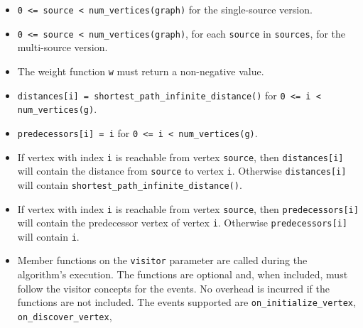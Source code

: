 \begin{itemdescr}
      \pnum\mandates
            \begin{itemize}
                  \item
                        \lstinline{0 <= source < num_vertices(graph)} for the single-source version.
                  \item
                        \lstinline{0 <= source < num_vertices(graph)}, for each \lstinline{source} in \lstinline{sources}, 
                                   for the multi-source version.
                  \item
                        The weight function \lstinline{w} must return a non-negative value.
            \end{itemize}
      \pnum\preconditions
            \begin{itemize}
                  \item
                        \lstinline{distances[i] = shortest_path_infinite_distance()} for \lstinline{0 <= i < num_vertices(g)}.
                  \item
                        \lstinline{predecessors[i] = i} for \lstinline{0 <= i < num_vertices(g)}.
            \end{itemize}
      \pnum\effects
            \begin{itemize}
                  \item
                        If vertex with index \lstinline{i} is reachable from vertex \lstinline{source}, then
                        \lstinline{distances[i]} will contain the distance from \lstinline{source} to vertex
                        \lstinline{i}.  Otherwise \lstinline{distances[i]} will contain
                        \lstinline{shortest_path_infinite_distance()}.
                  \item
                        If vertex with index \lstinline{i} is reachable
                        from vertex \lstinline{source}, then \lstinline{predecessors[i]} will contain the
                        predecessor vertex of vertex \lstinline{i}. Otherwise \lstinline{predecessors[i]} will contain
                        \lstinline{i}.
                  \item Member functions on the \lstinline{visitor} parameter are called during the algorithm's execution.
                        The functions are optional and, when included, must follow the visitor concepts for the events.
                        No overhead is incurred if the functions are not included.
                        The events supported are \lstinline{on_initialize_vertex}, \lstinline{on_discover_vertex},

\end{itemize}
\end{itemdescr}
